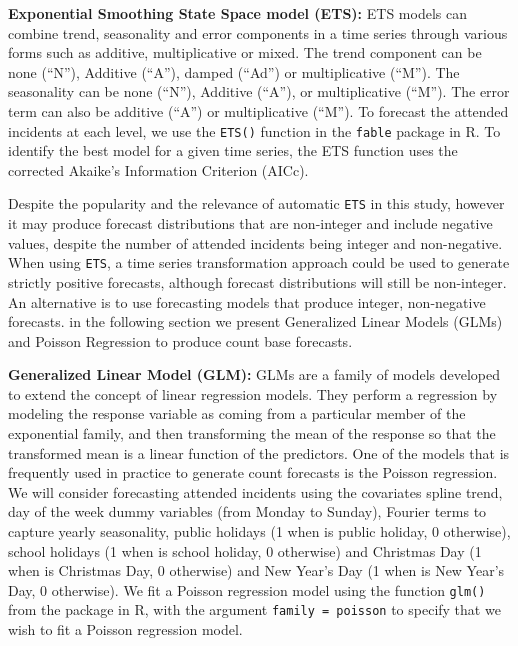 \documentclass[
  authoryear,
  preprint,
  3p]{elsarticle}
\begin{document}
\textbf{Exponential Smoothing State Space model (ETS):} ETS models
\citep{hyndman2021forecasting} can combine trend, seasonality and error
components in a time series through various forms such as additive,
multiplicative or mixed. The trend component can be none (``N''),
Additive (``A''), damped (``Ad'') or multiplicative (``M''). The
seasonality can be none (``N''), Additive (``A''), or multiplicative
(``M''). The error term can also be additive (``A'') or multiplicative
(``M''). To forecast the attended incidents at each level, we use the
\texttt{ETS()} function in the \texttt{fable} package \citep{fable2022}
in R. To identify the best model for a given time series, the ETS
function uses the corrected Akaike's Information Criterion (AICc).

Despite the popularity and the relevance of automatic \texttt{ETS} in
this study, however it may produce forecast distributions that are
non-integer and include negative values, despite the number of attended
incidents being integer and non-negative. When using \texttt{ETS}, a
time series transformation approach could be used to generate strictly
positive forecasts, although forecast distributions will still be
non-integer. An alternative is to use forecasting models that produce
integer, non-negative forecasts. in the following section we present
Generalized Linear Models (GLMs) and Poisson Regression to produce count
base forecasts.

\textbf{Generalized Linear Model (GLM):} GLMs are a family of models
developed to extend the concept of linear regression models. They
perform a regression by modeling the response variable as coming from a
particular member of the exponential family, and then transforming the
mean of the response so that the transformed mean is a linear function
of the predictors. One of the models that is frequently used in practice
to generate count forecasts is the Poisson regression. We will consider
forecasting attended incidents using the covariates spline trend, day of
the week dummy variables (from Monday to Sunday), Fourier terms to
capture yearly seasonality, public holidays (1 when is public holiday, 0
otherwise), school holidays (1 when is school holiday, 0 otherwise) and
Christmas Day (1 when is Christmas Day, 0 otherwise) and New Year's Day
(1 when is New Year's Day, 0 otherwise). We fit a Poisson regression
model using the function \texttt{glm()} from the package in R, with the
argument \texttt{family\ =\ poisson} to specify that we wish to fit a
Poisson regression model.
\end{document}

